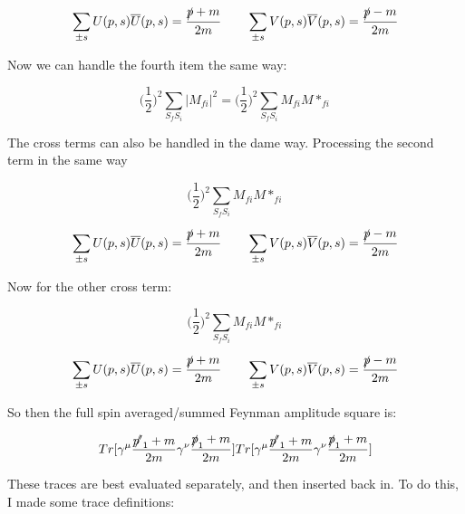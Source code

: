 \documentclass[a4]{article}
\begin{document}
    \begin{equation}
        \sum_{\pm s} U (p, s) \overline{U} (p, s) = \frac{\slashed{p} + m}{2m} \qquad \sum_{\pm s} V (p, s) \overline{V} (p, s) = \frac{\slashed{p} - m}{2m}
    \end{equation}

    Now we can handle the fourth item the same way:

    \begin{equation}
        \bigg( \frac{1}{2} \bigg)^2 \sum_{S_f S_i} |M_{f i}|^2 = \bigg( \frac{1}{2} \bigg)^2 \sum_{S_f S_i} M_{fi} M*_{fi}
    \end{equation}

    The cross terms can also be handled in the dame way. Processing the second term in the same way

    \begin{equation}
        \bigg( \frac{1}{2} \bigg)^2 \sum_{S_f S_i} M_{fi} M*_{fi}
    \end{equation}

    \begin{equation}
        \sum_{\pm s} U (p, s) \overline{U} (p, s) = \frac{\slashed{p} + m}{2m} \qquad \sum_{\pm s} V (p, s) \overline{V} (p, s) = \frac{\slashed{p} - m}{2m}
    \end{equation}

    Now for the other cross term:

    \begin{equation}
        \bigg( \frac{1}{2} \bigg)^2 \sum_{S_f S_i} M_{fi} M*_{fi}
    \end{equation}

    \begin{equation}
        \sum_{\pm s} U (p, s) \overline{U} (p, s) = \frac{\slashed{p} + m}{2m} \qquad \sum_{\pm s} V (p, s) \overline{V} (p, s) = \frac{\slashed{p} - m}{2m}
    \end{equation}

    So then the full spin averaged/summed Feynman amplitude square is:

    \begin{framed}
        \begin{equation}
            Tr [\gamma^\mu \frac{\slashed{p'}_1 + m}{2m} \gamma^\nu \frac{\slashed{p}_1 + m}{2 m}] Tr [\gamma^\mu \frac{\slashed{p'}_1 + m}{2m} \gamma^\nu \frac{\slashed{p}_1 + m}{2 m}]
        \end{equation}
    \end{framed}

    These traces are best evaluated separately, and then inserted back in. To do this, I made some trace definitions:
\end{document}
